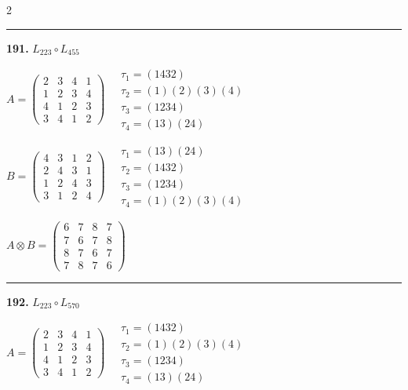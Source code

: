 \begin{multicols}{2}
\vspace{0.3em}
\hrule
\vspace{0.3em}

\noindent\textbf{191.} $L_{223} \circ L_{455}$

$A = \begin{pmatrix} 2 & 3 & 4 & 1 \\ 1 & 2 & 3 & 4 \\ 4 & 1 & 2 & 3 \\ 3 & 4 & 1 & 2 \end{pmatrix} \quad \begin{matrix} \tau_{1}=(1 4 3 2) \\ \tau_{2}=(1)(2)(3)(4) \\ \tau_{3}=(1 2 3 4) \\ \tau_{4}=(1 3)(2 4) \end{matrix}$

$B = \begin{pmatrix} 4 & 3 & 1 & 2 \\ 2 & 4 & 3 & 1 \\ 1 & 2 & 4 & 3 \\ 3 & 1 & 2 & 4 \end{pmatrix} \quad \begin{matrix} \tau_{1}=(1 3)(2 4) \\ \tau_{2}=(1 4 3 2) \\ \tau_{3}=(1 2 3 4) \\ \tau_{4}=(1)(2)(3)(4) \end{matrix}$

$A \otimes B = \begin{pmatrix} 6 & 7 & 8 & 7 \\ 7 & 6 & 7 & 8 \\ 8 & 7 & 6 & 7 \\ 7 & 8 & 7 & 6 \end{pmatrix}$

\vspace{0.3em}
\hrule
\vspace{0.3em}

\noindent\textbf{192.} $L_{223} \circ L_{570}$

$A = \begin{pmatrix} 2 & 3 & 4 & 1 \\ 1 & 2 & 3 & 4 \\ 4 & 1 & 2 & 3 \\ 3 & 4 & 1 & 2 \end{pmatrix} \quad \begin{matrix} \tau_{1}=(1 4 3 2) \\ \tau_{2}=(1)(2)(3)(4) \\ \tau_{3}=(1 2 3 4) \\ \tau_{4}=(1 3)(2 4) \end{matrix}$


\end{multicols}
